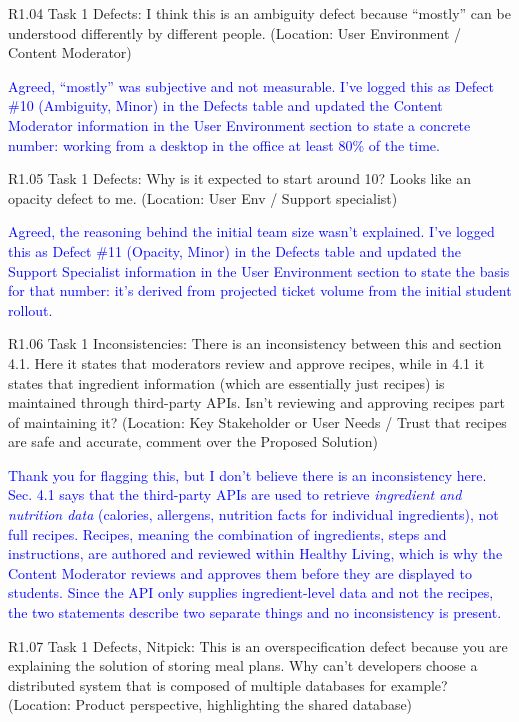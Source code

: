 \documentclass[10pt,letterpaper]{article}
\begin{document}
R1.04 Task 1 Defects: I think this is an ambiguity defect because ``mostly'' can be understood differently by different people. (Location: User Environment / Content Moderator)

\textcolor{blue}{Agreed, ``mostly'' was subjective and not measurable. I've logged this as Defect \#10 (Ambiguity, Minor) in the Defects table and updated the Content Moderator information in the User Environment section to state a concrete number: working from a desktop in the office at least 80\% of the time.}

R1.05 Task 1 Defects: Why is it expected to start around 10? Looks like an opacity defect to me. (Location: User Env / Support specialist)

\textcolor{blue}{Agreed, the reasoning behind the initial team size wasn't explained. I've logged this as Defect \#11 (Opacity, Minor) in the Defects table and updated the Support Specialist information in the User Environment section to state the basis for that number: it's derived from projected ticket volume from the initial student rollout.}

R1.06 Task 1 Inconsistencies: There is an inconsistency between this and section 4.1. Here it states that moderators review and approve recipes, while in 4.1 it states that ingredient information (which are essentially just recipes) is maintained through third-party APIs. Isn't reviewing and approving recipes part of maintaining it? (Location: Key Stakeholder or User Needs / Trust that recipes are safe and accurate, comment over the Proposed Solution)

\textcolor{blue}{Thank you for flagging this, but I don't believe there is an inconsistency here. Sec. 4.1 says that the third-party APIs are used to retrieve \textit{ingredient and nutrition data} (calories, allergens, nutrition facts for individual ingredients), not full recipes. Recipes, meaning the combination of ingredients, steps and instructions, are authored and reviewed within Healthy Living, which is why the Content Moderator reviews and approves them before they are displayed to students. Since the API only supplies ingredient-level data and not the recipes, the two statements describe two separate things and no inconsistency is present.}

R1.07 Task 1 Defects, Nitpick: This is an overspecification defect because you are explaining the solution of storing meal plans. Why can't developers choose a distributed system that is composed of multiple databases for example? (Location: Product perspective, highlighting the shared database)
\end{document}

